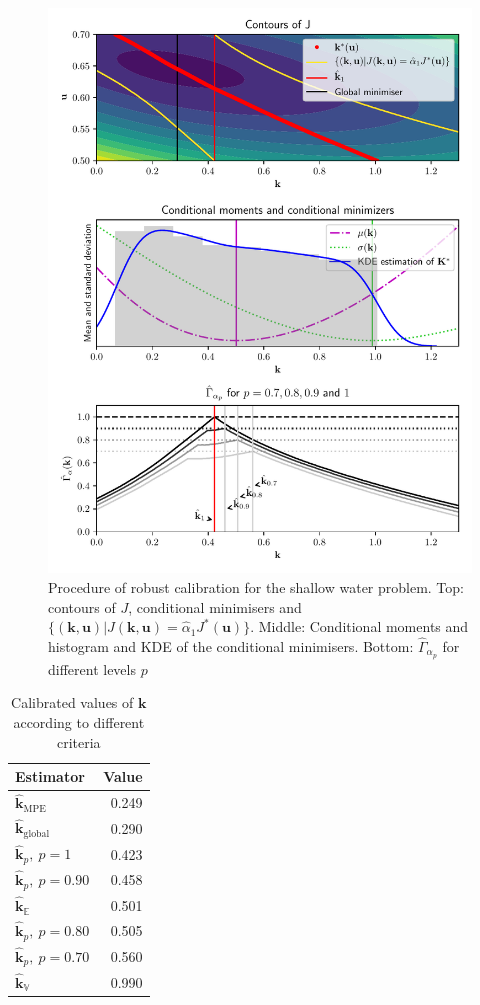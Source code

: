 \documentclass[preprint, 1p]{elsarticle}
\newcommand{\Ex}{\mathbb{E}}
\newcommand{\hatkmean}{\hat{\mathbf{k}}_{\Ex}}
\newcommand{\hatkvar}{\hat{\mathbf{k}}_{\mathbb{V}}}
\newcommand{\hatkmpe}{\hat{\mathbf{k}}_{\mathrm{MPE}}}
\newcommand{\kest}{\hat{\mathbf{k}}}
\newcommand{\hatkp}{\hat{\mathbf{k}}_p}
\begin{document}
\begin{figure}[!h]
\centering
\includegraphics[width=.7\textwidth]{Figures/RobustSWEmis_plots.pdf}
\caption{Procedure of robust calibration for the shallow water problem. Top: contours of $J$, conditional minimisers and $\{(\mathbf{k},\mathbf{u}) | J(\mathbf{k},\mathbf{u}) = \hat{\alpha}_1 J^*(\mathbf{u})\}$. Middle: Conditional moments and histogram and KDE of the conditional minimisers. Bottom: $\hat{\Gamma}_{\alpha_p}$ for different levels $p$}
\label{fig:estimation_swe}
\end{figure}
\begin{table}[!h]
\centering
\caption{Calibrated values of $\mathbf{k}$ according to different criteria}
\begin{tabular}{lr} \toprule
Estimator & Value \\ \midrule
$\hatkmpe$ & 0.249 \\
$\kest_{\mathrm{global}}$ & 0.290 \\
$\hatkp,~p=1$ & 0.423 \\ 
$\hatkp,~p=0.90$ & 0.458 \\ 
$\hatkmean$ & 0.501 \\ 
$\hatkp,~p=0.80$ & 0.505 \\ 
$\hatkp,~p=0.70$ & 0.560 \\ 
$\hatkvar$ & 0.990\\ \bottomrule
\end{tabular}
\label{tab:recap_estimates_metaSWE}
\end{table}
\end{document}
